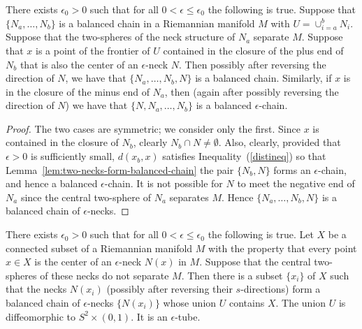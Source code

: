 \begin{lemma}
\label{lem:extend-balanced-chain}
\label{addaneck}
There exists $\epsilon_0>0$ such that for all $0<\epsilon\le
\epsilon_0$ the following is true.  Suppose that
$\{N_a,\ldots,N_b\}$ is a balanced chain in a Riemannian manifold
$M$ with $U=\cup_{i=a}^bN_i$. Suppose that the two-spheres of the
neck structure of $N_a$ separate $M$.
 Suppose that $x$
is a point of the frontier of $U$ contained in the closure of the
plus end of $N_b$ that is also the center of an $\epsilon$-neck $N$.
Then possibly after reversing the direction of $N$, we have that
$\{N_a,\ldots,N_b,N\}$ is a balanced chain. Similarly, if $x$ is in
the closure of the minus end of $N_a$, then (again after possibly
reversing the direction of $N$) we have that $\{N,N_a,\ldots,N_b\}$
is a balanced $\epsilon$-chain.
\end{lemma}

\begin{proof}
 The two cases are
symmetric; we consider only the first. Since $x$ is contained in the
closure of $N_b$, clearly $N_b\cap N\not=\emptyset$. Also, clearly,
provided that $\epsilon>0$ is sufficiently small, $d(x_b,x)$
satisfies Inequality~(\ref{distineq}) so that Lemma~\ref{lem:two-necks-form-balanced-chain}
the pair $\{N_b,N\}$ forms an $\epsilon$-chain, and hence a balanced
$\epsilon$-chain. It is not possible for $N$ to meet the negative
end of $N_a$ since the central two-sphere of $N_a$ separates $M$.
Hence $\{N_a,\ldots,N_b,N\}$ is a balanced chain of
$\epsilon$-necks.
\end{proof}

\begin{proposition}
\label{prop:balanced-chain-covers-connected-set}
\label{epschains}
There exists $\epsilon_0>0$ such that for all $0<\epsilon\le
\epsilon_0$ the following is true. Let $X$ be a connected subset of
a Riemannian manifold $M$ with the property that every point $x\in
X$ is the center of an $\epsilon$-neck $N(x)$ in $M$. Suppose that
the central two-spheres of these necks do not separate $M$. Then
there is a subset $\{x_i\}$ of $X$ such that the necks $N(x_i)$
(possibly after reversing their $s$-directions) form a balanced
chain of $\epsilon$-necks $\{N(x_i)\}$ whose union $U$ contains $X$.
The union $U$ is diffeomorphic to $S^2\times (0,1)$. It is an
$\epsilon$-tube.
\end{proposition}

